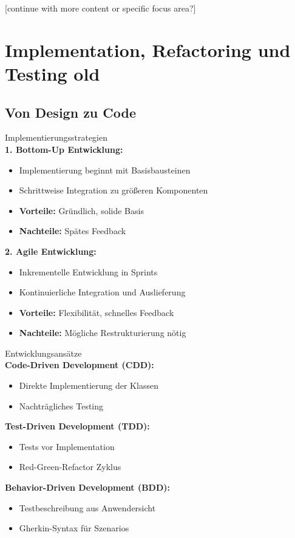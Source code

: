 [continue with more content or specific focus area?]




\pagebreak
\section{Implementation, Refactoring und Testing old}

\subsection{Von Design zu Code}

\begin{concept}{Implementierungsstrategien}\\
\textbf{1. Bottom-Up Entwicklung:}
\begin{itemize}
    \item Implementierung beginnt mit Basisbausteinen
    \item Schrittweise Integration zu größeren Komponenten
    \item \textbf{Vorteile:} Gründlich, solide Basis
    \item \textbf{Nachteile:} Spätes Feedback
\end{itemize}

\textbf{2. Agile Entwicklung:}
\begin{itemize}
    \item Inkrementelle Entwicklung in Sprints
    \item Kontinuierliche Integration und Auslieferung
    \item \textbf{Vorteile:} Flexibilität, schnelles Feedback
    \item \textbf{Nachteile:} Mögliche Restrukturierung nötig
\end{itemize}
\end{concept}

\begin{definition}{Entwicklungsansätze}\\
\textbf{Code-Driven Development (CDD):}
\begin{itemize}
    \item Direkte Implementierung der Klassen
    \item Nachträgliches Testing
\end{itemize}

\textbf{Test-Driven Development (TDD):}
\begin{itemize}
    \item Tests vor Implementation
    \item Red-Green-Refactor Zyklus
\end{itemize}

\textbf{Behavior-Driven Development (BDD):}
\begin{itemize}
    \item Testbeschreibung aus Anwendersicht
    \item Gherkin-Syntax für Szenarios
\end{itemize}
\end{definition}

